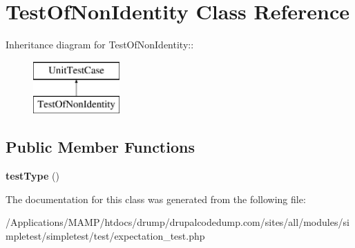 \hypertarget{class_test_of_non_identity}{
\section{TestOfNonIdentity Class Reference}
\label{class_test_of_non_identity}
}
Inheritance diagram for TestOfNonIdentity::\begin{figure}[H]
\begin{center}
\leavevmode
\includegraphics[height=2cm]{class_test_of_non_identity}
\end{center}
\end{figure}
\subsection*{Public Member Functions}
\begin{DoxyCompactItemize}
\item 
\hypertarget{class_test_of_non_identity_a962ec2f8884de4de6ed9b433ad10fcc8}{
{\bfseries testType} ()}
\label{class_test_of_non_identity_a962ec2f8884de4de6ed9b433ad10fcc8}

\end{DoxyCompactItemize}


The documentation for this class was generated from the following file:\begin{DoxyCompactItemize}
\item 
/Applications/MAMP/htdocs/drump/drupalcodedump.com/sites/all/modules/simpletest/simpletest/test/expectation\_\-test.php\end{DoxyCompactItemize}
